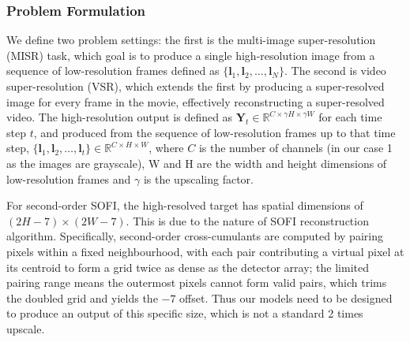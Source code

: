 \subsubsection{Problem Formulation}
\label{sec:problem}
We define two problem settings: the first is the multi-image super-resolution (MISR) task, which goal is to 
produce a single high-resolution image from a sequence of low-resolution frames defined as $\{\mathbf{l}_1, \mathbf{l}_2, \ldots, \mathbf{l}_N\}$. 
The second is video super-resolution (VSR), which extends the first by producing a super-resolved image for 
every frame in the movie, effectively reconstructing a super-resolved video. The high-resolution output is 
defined as $\mathbf{Y}_t \in \mathbb{R}^{C \times \gamma H \times \gamma W}$ for each time step $t$, and produced from the sequence of low-resolution frames up 
to that time step, $\{\mathbf{l}_1, \mathbf{l}_2, \ldots, \mathbf{l}_t\} \in \mathbb{R}^{C \times H \times W}$, 
where $C$ is the number of channels (in our case 1 as the images are grayscale), W and H are the width and height dimensions of 
low-resolution frames and $\gamma$ is the upscaling factor.

For second-order SOFI, the high-resolved target has spatial dimensions of $(2H - 7) \times (2W - 7)$. This is
due to the nature of SOFI reconstruction algorithm. Specifically, second-order cross-cumulants are computed by
pairing pixels within a fixed neighbourhood, with each pair contributing a virtual pixel at its centroid to form a
grid twice as dense as the detector array; the limited pairing range means the outermost pixels cannot form valid
pairs, which trims the doubled grid and yields the $-7$ offset. Thus our models need to be designed to produce an output
of this specific size, which is not a standard 2 times upscale.

